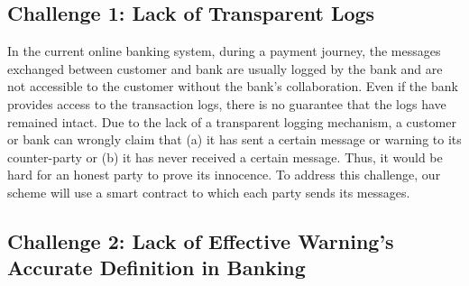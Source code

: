 


\subsection{Challenge 1: Lack of Transparent Logs} 
In the current online banking system, during a payment journey, the messages exchanged between customer and bank are usually logged by the bank and are not accessible to the customer without the bank's collaboration. Even if the bank provides access to the transaction logs, there is no guarantee that the logs have remained intact. Due to the lack of a transparent logging mechanism, a customer or bank can wrongly claim that (a) it has sent a certain message or warning to its counter-party or (b) it has never received a certain message.  Thus, it would be hard for an honest party to prove its innocence. To address this challenge, our scheme will use a  smart contract to which each party sends its messages.


\subsection{Challenge 2: Lack of Effective Warning's Accurate Definition in Banking}\label{sec::Lack-of-Effective-Warning-Definition}


